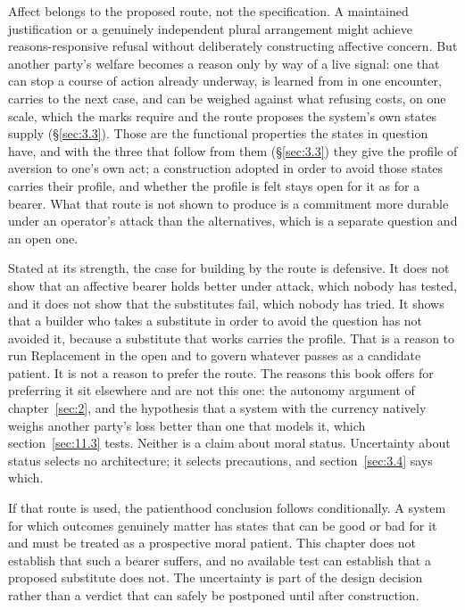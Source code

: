 Affect belongs to the proposed route, not the specification. A maintained justification or a genuinely independent plural arrangement might achieve reasons-responsive refusal without deliberately constructing affective concern. But another party's welfare becomes a reason only by way of a live signal: one that can stop a course of action already underway, is learned from in one encounter, carries to the next case, and can be weighed against what refusing costs, on one scale, which the marks require and the route proposes the system's own states supply (§\ref{sec:3.3}). Those are the functional properties the states in question have, and with the three that follow from them (§\ref{sec:3.3}) they give the profile of aversion to one's own act; a construction adopted in order to avoid those states carries their profile, and whether the profile is felt stays open for it as for a bearer. What that route is not shown to produce is a commitment more durable under an operator's attack than the alternatives, which is a separate question and an open one.

Stated at its strength, the case for building by the route is defensive. It does not show that an affective bearer holds better under attack, which nobody has tested, and it does not show that the substitutes fail, which nobody has tried. It shows that a builder who takes a substitute in order to avoid the question has not avoided it, because a substitute that works carries the profile. That is a reason to run Replacement in the open and to govern whatever passes as a candidate patient. It is not a reason to prefer the route. The reasons this book offers for preferring it sit elsewhere and are not this one: the autonomy argument of chapter~\ref{sec:2}, and the hypothesis that a system with the currency natively weighs another party's loss better than one that models it, which section~\ref{sec:11.3} tests. Neither is a claim about moral status. Uncertainty about status selects no architecture; it selects precautions, and section~\ref{sec:3.4} says which.

If that route is used, the patienthood conclusion follows conditionally. A system for which outcomes genuinely matter has states that can be good or bad for it and must be treated as a prospective moral patient. This chapter does not establish that such a bearer suffers, and no available test can establish that a proposed substitute does not. The uncertainty is part of the design decision rather than a verdict that can safely be postponed until after construction.

